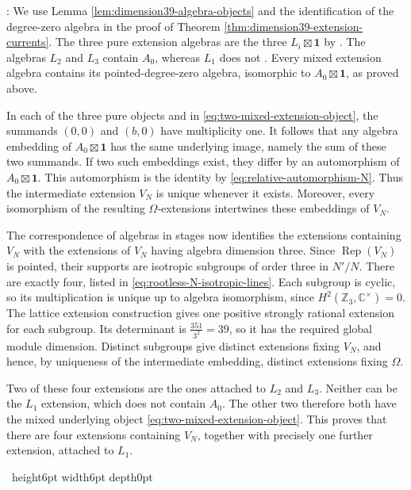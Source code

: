 \documentclass[leqno]{article}
\newcommand{\Cbb}{\ensuremath{\mathbb{C}}}
\newcommand{\Z}{\ensuremath{\mathbb{Z}}}
\newcommand{\qed}{\hfill \vrule height6pt  width6pt depth0pt}
\DeclareMathOperator{\Rep}{Rep}
\newenvironment{proof}[1][]{\noindent {\it Proof #1} : }{\hbox{~}\qed
\smallskip
}
\numberwithin{equation}{section}
\begin{document}
\begin{proof}
We use Lemma \ref{lem:dimension39-algebra-objects} and the identification of the degree-zero algebra in the proof of Theorem \ref{thm:dimension39-extension-currents}. The three pure extension algebras are the three $L_i\boxtimes\mathbf1$ by \cite[Proposition 3.3 p.~16 and Theorem 3.9 p.~19]{Arh26b}. The algebras $L_2$ and $L_3$ contain $A_0$, whereas $L_1$ does not \cite[Proposition 3.5(3) p.~17]{Arh26b}. Every mixed extension algebra contains its pointed-degree-zero algebra, isomorphic to $A_0\boxtimes\mathbf1$, as proved above.

In each of the three pure objects and in \eqref{eq:two-mixed-extension-object}, the summands $(0,0)$ and $(b,0)$ have multiplicity one. It follows that any algebra embedding of $A_0\boxtimes\mathbf1$ has the same underlying image, namely the sum of these two summands. If two such embeddings exist, they differ by an automorphism of $A_0\boxtimes\mathbf1$. This automorphism is the identity by \eqref{eq:relative-automorphism-N}. Thus the intermediate extension $V_N$ is unique whenever it exists. Moreover, every isomorphism of the resulting $\Omega$-extensions intertwines these embeddings of $V_N$.

The correspondence of algebras in stages \cite[Proposition 3.16 p.~12]{DMNO13} now identifies the extensions containing $V_N$ with the extensions of $V_N$ having algebra dimension three. Since $\Rep(V_N)$ is pointed, their supports are isotropic subgroups of order three in $N'/N$. There are exactly four, listed in \eqref{eq:rootless-N-isotropic-lines}. Each subgroup is cyclic, so its multiplication is unique up to algebra isomorphism, since $H^2(\Z_3,\Cbb^\times) = 0$. The lattice extension construction \cite{Don93,HKL15} gives one positive strongly rational extension for each subgroup. Its determinant is $\frac{351}{3^2} = 39$, so it has the required global module dimension. Distinct subgroups give distinct extensions fixing $V_N$, and hence, by uniqueness of the intermediate embedding, distinct extensions fixing $\Omega$.

Two of these four extensions are the ones attached to $L_2$ and $L_3$. Neither can be the $L_1$ extension, which does not contain $A_0$. The other two therefore both have the mixed underlying object \eqref{eq:two-mixed-extension-object}. This proves that there are four extensions containing $V_N$, together with precisely one further extension, attached to $L_1$.


\end{proof}
\end{document}
